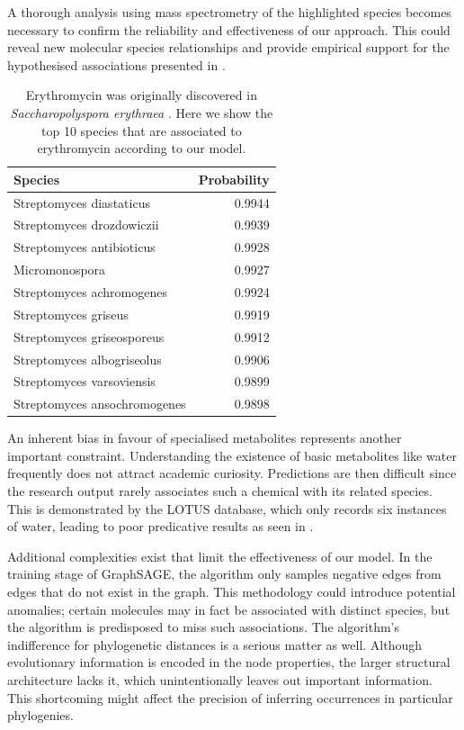 \documentclass[
11pt, %
oneside, %
english, %
singlespacing, %
headsepline, %
chapterinoneline, %
]{MastersDoctoralThesis} %
\begin{document}
A thorough analysis using mass spectrometry of the highlighted species becomes necessary to confirm the reliability and effectiveness of our approach. This could reveal new molecular species relationships and provide empirical support for the hypothesised associations presented in .

\begin{table}[h]
	\centering
	\caption{Erythromycin was originally discovered in \textit{Saccharopolyspora erythraea } \cite{beranIsolationErythromycinNoxide1991}. Here we show the top 10 species that are associated to erythromycin according to our model.}
	\begin{tabular}{lr}
		\toprule
		Species & Probability \\
		\midrule
		Streptomyces diastaticus & 0.9944 \\
		Streptomyces drozdowiczii & 0.9939 \\
		Streptomyces antibioticus & 0.9928 \\
		Micromonospora & 0.9927 \\
		Streptomyces achromogenes & 0.9924 \\
		Streptomyces griseus & 0.9919 \\
		Streptomyces griseosporeus & 0.9912 \\
		Streptomyces albogriseolus & 0.9906 \\
		Streptomyces varsoviensis & 0.9899 \\
		Streptomyces ansochromogenes & 0.9898 \\
		\bottomrule
	\end{tabular}
	\label{table: Erythromycin top scores}
\end{table}

An inherent bias in favour of specialised metabolites represents another important constraint. Understanding the existence of basic metabolites like water frequently does not attract academic curiosity. Predictions are then difficult since the research output rarely associates such a chemical with its related species. This is demonstrated by the LOTUS database, which only records six instances of water, leading to poor predicative results as seen in .

Additional complexities exist that limit the effectiveness of our model. In the training stage of GraphSAGE, the algorithm only samples negative edges from edges that do not exist in the graph. This methodology could introduce potential anomalies; certain molecules may in fact be associated with distinct species, but the algorithm is predisposed to miss such associations. The algorithm's indifference for phylogenetic distances is a serious matter as well. Although evolutionary information is encoded in the node properties, the larger structural architecture lacks it, which unintentionally leaves out important information. This shortcoming might affect the precision of inferring occurrences in particular phylogenies. 
\end{document}

